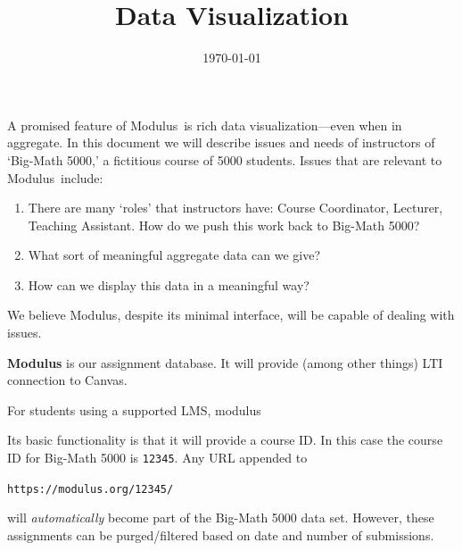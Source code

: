 \documentclass{techbrief}
\title{Data\! Visualization}
\date{\today}
\newcommand{\modulus}{\textsf{Modulus}}
\begin{document}
\pagestyle{main}%
\thispagestyle{title}
\lettrine[lines=2]{A}{} promised feature of \modulus\ is rich data
visualization---even when in
aggregate.
In this document we will describe issues and needs of instructors of `Big-Math
5000,' a fictitious course of 5000 students.
Issues that are relevant to \modulus\ include:
\begin{enumerate}
    \item There are many `roles' that instructors have: Course Coordinator,
          Lecturer, Teaching Assistant. How do we push this work back to
          Big-Math 5000?
    \item What sort of meaningful aggregate data can we give?
    \item How can we display this data in a meaningful way?
\end{enumerate}

We believe \modulus, despite its minimal interface, will be capable of dealing
with issues.

\begin{xframe}{\bfseries \modulus} is our assignment database. It will provide (among other things) LTI connection to Canvas.

    \begin{center}
    \end{center}
    For students using a supported LMS, modulus
    
    Its basic functionality is that it will provide a course ID. In this case the course ID for Big-Math 5000 is \texttt{12345}.
    Any URL appended to
    \begin{center}
        \texttt{https://modulus.org/12345/}
    \end{center}
    will \textit{automatically} become part of the Big-Math 5000 data set. However, these assignments can be purged/filtered based on date and number of submissions. 
\end{xframe}
\end{document}
